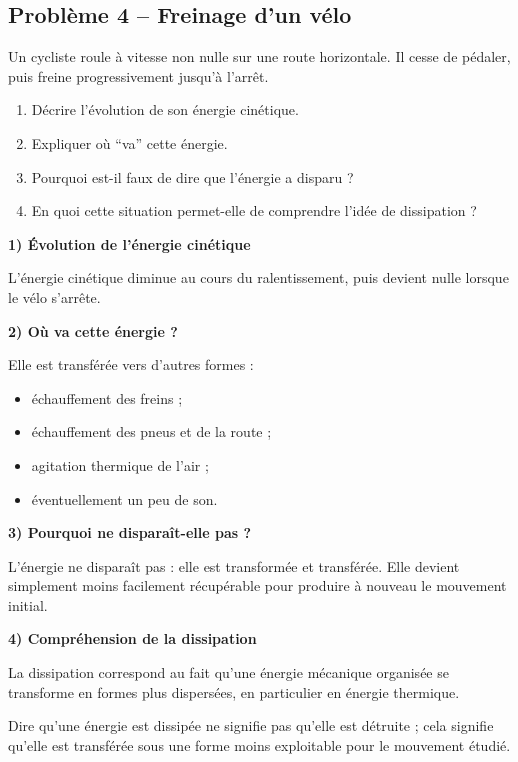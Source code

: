 \documentclass[11pt,a4paper]{article}
\begin{document}
\subsection{Problème 4 -- Freinage d'un vélo}

\begin{enoncebox}
Un cycliste roule à vitesse non nulle sur une route horizontale.  
Il cesse de pédaler, puis freine progressivement jusqu'à l'arrêt.

\begin{enumerate}[label=\arabic*)]
    \item Décrire l'évolution de son énergie cinétique.
    \item Expliquer où ``va'' cette énergie.
    \item Pourquoi est-il faux de dire que l'énergie a disparu ?
    \item En quoi cette situation permet-elle de comprendre l'idée de dissipation ?
\end{enumerate}
\end{enoncebox}

\begin{corrigebox}
\textbf{1) Évolution de l'énergie cinétique}

L'énergie cinétique diminue au cours du ralentissement, puis devient nulle lorsque le vélo s'arrête.

\textbf{2) Où va cette énergie ?}

Elle est transférée vers d'autres formes :
\begin{itemize}
    \item échauffement des freins ;
    \item échauffement des pneus et de la route ;
    \item agitation thermique de l'air ;
    \item éventuellement un peu de son.
\end{itemize}

\textbf{3) Pourquoi ne disparaît-elle pas ?}

L'énergie ne disparaît pas : elle est transformée et transférée.  
Elle devient simplement moins facilement récupérable pour produire à nouveau le mouvement initial.

\textbf{4) Compréhension de la dissipation}

La dissipation correspond au fait qu'une énergie mécanique organisée se transforme en formes plus dispersées, en particulier en énergie thermique.

\begin{bilanbox}
Dire qu'une énergie est dissipée ne signifie pas qu'elle est détruite ; cela signifie qu'elle est transférée sous une forme moins exploitable pour le mouvement étudié.
\end{bilanbox}
\end{corrigebox}
\end{document}
